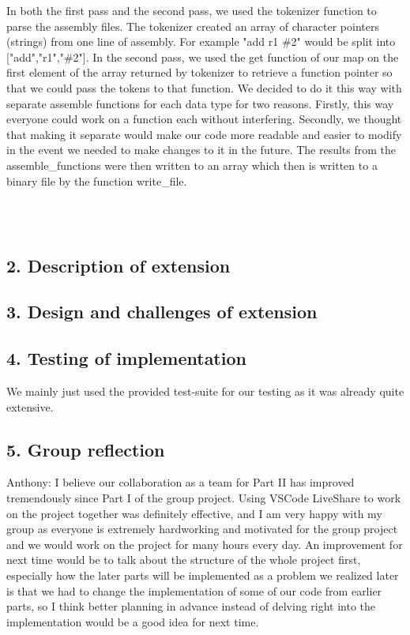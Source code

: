 \documentclass[a4paper]{article}
\begin{document}
\par
In both the first pass and the second pass, we used the tokenizer function to parse the assembly files. The tokenizer
created an array of character pointers (strings) from one line of assembly. For example "add r1 \#2" would be split
into ["add","r1","\#2"]. In the second pass, we used the get function of our map on the first element of the array
returned by tokenizer to retrieve a function pointer so that we could pass the tokens to that function. We decided
to do it this way with separate assemble functions for each data type for two reasons. Firstly, this way everyone
could work on a function each without interfering. Secondly, we thought that making it separate would make our
code more readable and easier to modify in the event we needed to make changes to it in the future. The results from
the assemble{\_}functions were then written to an array which then is written to a binary file by the function write{\_}file.


\\ \\
\bigskip
\subsection*{2. Description of extension}
\bigskip
\subsection*{3. Design and challenges of extension}
\bigskip
\subsection*{4. Testing of implementation}
We mainly just used the provided test-suite for our testing as it was already quite extensive. 
\bigskip
\subsection*{5. Group reflection}

Anthony: I believe our collaboration as a team for Part II has improved tremendously since Part I of the group project. Using VSCode 
LiveShare to work on the project together was definitely effective, and I am very happy with my group as everyone is extremely 
hardworking and motivated for the group project and we would work on the project for many hours every day. An improvement for 
next time would be to talk about the structure of the whole project first, especially how the later parts will be implemented as 
a problem we realized later is that we had to change the implementation of some of our code from earlier parts, so I think better 
planning in advance instead of delving right into the implementation would be a good idea for next time. 
\end{document}
